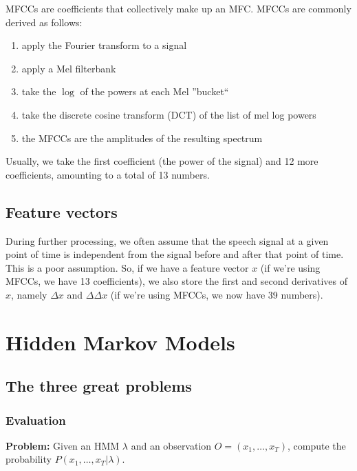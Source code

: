 \documentclass[11pt]{article}
\begin{document}
MFCCs are coefficients that collectively make up an MFC. MFCCs are commonly derived as follows:

\begin{enumerate}
    \item apply the Fourier transform to a signal
    \item apply a Mel filterbank
    \item take the $\log$ of the powers at each Mel ''bucket``
    \item take the discrete cosine transform (DCT) of the list of mel log powers
    \item the MFCCs are the amplitudes of the resulting spectrum
\end{enumerate}

Usually, we take the first coefficient (the power of the signal) and 12 more coefficients, amounting to a total of 13 numbers.

\subsection{Feature vectors}

During further processing, we often assume that the speech signal at a given point of time is independent from the signal before and after that point of time. This is a poor assumption. So, if we have a feature vector $x$ (if we're using MFCCs, we have 13 coefficients), we also store the first and second derivatives of $x$, namely $\Delta x$ and $\Delta \Delta x$ (if we're using MFCCs, we now have 39 numbers).

\section{Hidden Markov Models}

\subsection{The three great problems}

\subsubsection{Evaluation}

\textbf{Problem:} Given an HMM $\lambda$ and an observation $O = (x_1, \ldots, x_T)$, compute the probability $P(x_1, \ldots, x_T | \lambda)$.

\vspace{10pt}
\end{document}

